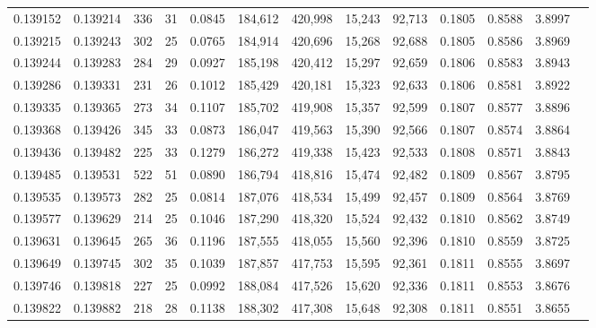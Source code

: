 \begin{tabular}{rrrrrrrrrrrrr}
0.139152 & 0.139214 &   336 &  31 &                                     0.0845 & 184,612 & 420,998 &  15,243 &  92,713 & 0.1805 & 0.8588 & 3.8997 \\
0.139215 & 0.139243 &   302 &  25 &                                     0.0765 & 184,914 & 420,696 &  15,268 &  92,688 & 0.1805 & 0.8586 & 3.8969 \\
0.139244 & 0.139283 &   284 &  29 &                                     0.0927 & 185,198 & 420,412 &  15,297 &  92,659 & 0.1806 & 0.8583 & 3.8943 \\
0.139286 & 0.139331 &   231 &  26 &                                     0.1012 & 185,429 & 420,181 &  15,323 &  92,633 & 0.1806 & 0.8581 & 3.8922 \\
0.139335 & 0.139365 &   273 &  34 &                                     0.1107 & 185,702 & 419,908 &  15,357 &  92,599 & 0.1807 & 0.8577 & 3.8896 \\
0.139368 & 0.139426 &   345 &  33 &                                     0.0873 & 186,047 & 419,563 &  15,390 &  92,566 & 0.1807 & 0.8574 & 3.8864 \\
0.139436 & 0.139482 &   225 &  33 &                                     0.1279 & 186,272 & 419,338 &  15,423 &  92,533 & 0.1808 & 0.8571 & 3.8843 \\
0.139485 & 0.139531 &   522 &  51 &                                     0.0890 & 186,794 & 418,816 &  15,474 &  92,482 & 0.1809 & 0.8567 & 3.8795 \\
0.139535 & 0.139573 &   282 &  25 &                                     0.0814 & 187,076 & 418,534 &  15,499 &  92,457 & 0.1809 & 0.8564 & 3.8769 \\
0.139577 & 0.139629 &   214 &  25 &                                     0.1046 & 187,290 & 418,320 &  15,524 &  92,432 & 0.1810 & 0.8562 & 3.8749 \\
0.139631 & 0.139645 &   265 &  36 &                                     0.1196 & 187,555 & 418,055 &  15,560 &  92,396 & 0.1810 & 0.8559 & 3.8725 \\
0.139649 & 0.139745 &   302 &  35 &                                     0.1039 & 187,857 & 417,753 &  15,595 &  92,361 & 0.1811 & 0.8555 & 3.8697 \\
0.139746 & 0.139818 &   227 &  25 &                                     0.0992 & 188,084 & 417,526 &  15,620 &  92,336 & 0.1811 & 0.8553 & 3.8676 \\
0.139822 & 0.139882 &   218 &  28 &                                     0.1138 & 188,302 & 417,308 &  15,648 &  92,308 & 0.1811 & 0.8551 & 3.8655 \\

\end{tabular}
